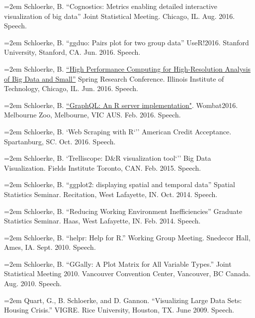 \documentclass[oneside]{article}
\begin{document}
    \hangindent=2em
    Schloerke, B. ``Cognostics: Metrics enabling detailed interactive visualization of big data'' Joint Statistical Meeting. Chicago, IL. Aug. 2016. Speech.

    \hangindent=2em
    Schloerke, B. ``ggduo: Pairs plot for two group data'' UseR!2016. Stanford University, Stanford, CA. Jun. 2016. Speech.

    \hangindent=2em
    Schloerke, B. \href{https://slides.com/schloerke/tessera-src-2016-5-25}{``High Performance Computing for High-Resolution Analysis of Big Data and Small''} Spring Research Conference. Illinois Institute of Technology, Chicago, IL. Jun. 2016. Speech.

    \hangindent=2em
    Schloerke, B. \href{http://wombat2016.org/abstracts/barret.html}{``GraphQL: An R server implementation"}. Wombat2016. Melbourne Zoo, Melbourne, VIC AUS. Feb. 2016. Speech.

    \hangindent=2em
    Schloerke, B. `Web Scraping with R`'' American Credit Acceptance. Spartanburg, SC. Oct. 2016. Speech.

    \hangindent=2em
    Schloerke, B. `Trelliscope: D\&R visualization tool`'' Big Data Visualization. Fields Institute Toronto, CAN. Feb. 2015. Speech.

    \hangindent=2em
    Schloerke, B. ``ggplot2: displaying spatial and temporal data'' Spatial Statistics Seminar. Recitation, West Lafayette, IN. Oct. 2014. Speech.

    \hangindent=2em
    Schloerke, B. ``Reducing Working Environment Inefficiencies'' Graduate Statistics Seminar. Haas, West Lafayette, IN. Feb. 2014. Speech.

    \hangindent=2em
    Schloerke, B. ``helpr: Help for R.'' Working Group Meeting. Snedecor Hall, Ames, IA. Sept. 2010. Speech.

    \hangindent=2em
    Schloerke, B. ``GGally: A Plot Matrix for All Variable Types.'' Joint Statistical Meeting 2010. Vancouver  Convention Center, Vancouver, BC Canada. Aug. 2010. Speech.

    \hangindent=2em
    Quart, G., B. Schloerke, and D. Gannon. ``Visualizing Large Data Sets: Housing Crisis.'' VIGRE. Rice  University, Houston, TX. June 2009. Speech.
\end{document}
